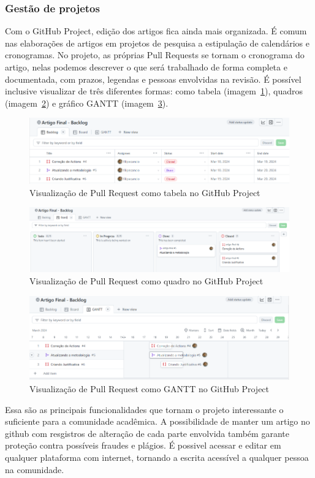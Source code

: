 \subsubsection{Gestão de projetos}
Com o GitHub Project,  edição dos artigos fica ainda mais organizada. É comum nas elaborações de artigos em projetos de pesquisa a estipulação de calendários e cronogramas. No projeto, as próprias Pull Requests se tornam o cronograma do artigo, nelas podemos descrever o que será trabalhado de forma completa e documentada, com prazos, legendas e pessoas envolvidas na revisão. É possível inclusive visualizar de três diferentes formas: como tabela (imagem~\ref{fig:fig07}), quadros (imagem~\ref{fig:fig08}) e gráfico GANTT (imagem~\ref{fig:fig09}).

\begin{figure}[ht]
	\centering
	\includegraphics[width=.5\textwidth]{./images/fig07.png}
	\caption{Visualização de Pull Request como tabela no GitHub Project}
	\label{fig:fig07}
\end{figure}

\begin{figure}[ht]
	\centering
	\includegraphics[width=.5\textwidth]{./images/fig08.png}
	\caption{Visualização de Pull Request como quadro no GitHub Project}
	\label{fig:fig08}
\end{figure}

\begin{figure}[ht]
	\centering
	\includegraphics[width=.5\textwidth]{./images/fig09.png}
	\caption{Visualização de Pull Request como GANTT no GitHub Project}
	\label{fig:fig09}
\end{figure}

Essa são as principais funcionalidades que tornam o projeto interessante o suficiente para a comunidade acadêmica. A possibilidade de manter um artigo no github com resgistros de alteração de cada parte envolvida também garante proteção contra possíveis fraudes e plágios. É possivel acessar e editar em qualquer plataforma com internet, tornando a escrita acessível a qualquer pessoa na comunidade.

